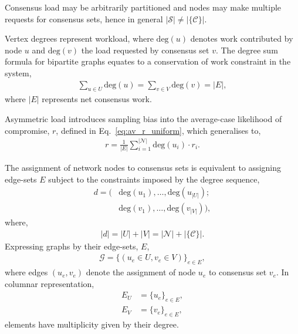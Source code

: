 Consensus load may be arbitrarily partitioned and nodes may make multiple requests for consensus sets, hence in general $|\mathcal{S}|\neq|\{\mathcal{C}\}|$. %

Vertex degrees represent workload, where $\mathrm{deg}(u)$ denotes work contributed by node $u$ and $\mathrm{deg}(v)$ the load requested by consensus set $v$. The degree sum formula for bipartite graphs equates to a conservation of work constraint in the system,
\begin{align} \label{eq:degree_sum}
	\sum_{u\in U} \mathrm{deg}(u) = \sum_{v\in V} \mathrm{deg}(v) = |E|,
\end{align}
where $|E|$ represents net consensus work.

Asymmetric load introduces sampling bias into the average-case likelihood of compromise, $r$, defined in Eq.~\eqref{eq:av_r_uniform}, which generalises to,
\begin{align}
	r = \frac{1}{|E|} \sum_{i=1}^{|\mathcal{N}|} \mathrm{deg}(u_i) \cdot r_i.
\end{align}

The assignment of network nodes to consensus sets is equivalent to assigning edge-sets $E$ subject to the constraints imposed by the degree sequence,
\begin{align} \label{eq:degree_seq}
	d = ( & \mathrm{deg}(u_1),\dots,\mathrm{deg}(u_{|U|});\nonumber \\
	      & \mathrm{deg}(v_1),\dots,\mathrm{deg}(v_{|V|})),
\end{align}
where,
\begin{align}
	|d| = |U|+|V| = |\mathcal{N}|+|\{\mathcal{C}\}|.
\end{align}
Expressing graphs by their edge-sets, $E$,
\begin{align}
	\mathcal{G} = \{(u_e\in U, v_e\in V)\}_{e\in E},
\end{align}
where edges $(u_e,v_e)$ denote the assignment of node $u_e$ to consensus set $v_e$. In columnar representation,
\begin{align}
	E_U & = \{u_e\}_{e\in E},\nonumber \\
	E_V & = \{v_e\}_{e\in E},
\end{align}
elements have multiplicity given by their degree.


